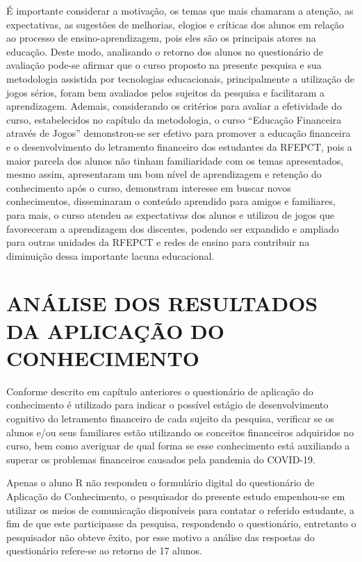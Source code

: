 É importante considerar a motivação, os temas que mais chamaram a atenção, as expectativas, as sugestões de melhorias, elogios e críticas dos alunos em relação ao processo de ensino-aprendizagem, pois eles são os principais atores na educação. Deste modo, analisando o retorno dos alunos no questionário de avaliação pode-se afirmar que o curso proposto na presente pesquisa e sua metodologia assistida por tecnologias educacionais, principalmente a utilização de jogos sérios, foram bem avaliados pelos sujeitos da pesquisa e facilitaram a aprendizagem. Ademais, considerando os critérios para avaliar a efetividade do curso, estabelecidos no capítulo da metodologia, o curso “Educação Financeira através de Jogos” demonstrou-se ser efetivo para promover a educação financeira e o desenvolvimento do letramento financeiro dos estudantes da RFEPCT, pois a maior parcela dos alunos não tinham familiaridade com os temas apresentados, mesmo assim, apresentaram um bom nível de aprendizagem e retenção do conhecimento após o curso, demonstram interesse em buscar novos conhecimentos, disseminaram o conteúdo aprendido para amigos e familiares, para mais, o curso atendeu as expectativas dos alunos e utilizou de jogos que favoreceram a aprendizagem dos discentes, podendo ser expandido e ampliado para outras unidades da RFEPCT e redes de ensino para contribuir na diminuição dessa importante lacuna educacional.

\newpage
\section{ANÁLISE DOS RESULTADOS DA APLICAÇÃO DO CONHECIMENTO}
Conforme descrito em capítulo anteriores o questionário de aplicação do conhecimento é utilizado para indicar o possível estágio de desenvolvimento cognitivo do letramento financeiro de cada sujeito da pesquisa, verificar se os alunos e/ou seus familiares estão utilizando os conceitos financeiros adquiridos no curso, bem como averiguar de qual forma se esse conhecimento está auxiliando a superar os problemas financeiros causados pela pandemia do COVID-19.

Apenas o aluno R não respondeu o formulário digital do questionário de Aplicação do Conhecimento, o pesquisador do presente estudo empenhou-se em utilizar os meios de comunicação disponíveis para contatar o referido estudante, a fim de que este participasse da pesquisa, respondendo o questionário, entretanto o pesquisador não obteve êxito, por esse motivo a análise das respostas do questionário refere-se ao retorno de 17 alunos.

